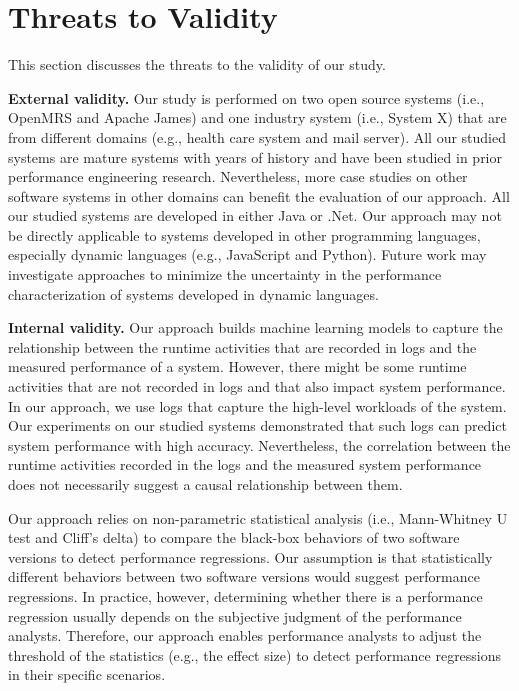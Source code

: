 \section{Threats to Validity} \label{sec:threats}

This section discusses the threats to the validity of our study.

\noindent \textbf{External validity.}
Our study is performed on two open source systems (i.e., OpenMRS and Apache James) and one industry system (i.e., System X) that are from different domains (e.g., health care system and mail server). 
All our studied systems are mature systems with years of history and have been studied in prior performance engineering research. Nevertheless, more case studies on other software systems in other domains can benefit the evaluation of our approach.
All our studied systems are developed in either Java or .Net. Our approach may not be directly applicable to systems developed in other programming languages, especially dynamic languages (e.g., JavaScript and Python). Future work may investigate approaches to minimize the uncertainty in the performance characterization of systems developed in dynamic languages.

\noindent \textbf{Internal validity.}
Our approach builds machine learning models to capture the relationship between the runtime activities that are recorded in logs and the measured performance of a system. 
However, there might be some runtime activities that are not recorded in logs and that also impact system performance.
In our approach, we use logs that capture the high-level workloads of the system. 
Our experiments on our studied systems demonstrated that such logs can predict system performance with high accuracy.
Nevertheless, the correlation between the runtime activities recorded in the logs and the measured system performance does not necessarily suggest a causal relationship between them.


Our approach relies on non-parametric statistical analysis (i.e., Mann-Whitney U test and Cliff's delta) to compare the black-box behaviors of two software versions to detect performance regressions. 
Our assumption is that statistically different behaviors between two software versions would suggest performance regressions.
In practice, however, determining whether there is a performance regression usually depends on the subjective judgment of the performance analysts.
Therefore, our approach enables performance analysts to adjust the threshold of the statistics (e.g., the effect size) to detect performance regressions in their specific scenarios.

